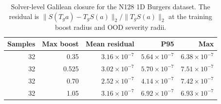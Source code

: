 \begin{table}[t]
\centering
\small
\caption{Solver-level Galilean closure for the N128 1D Burgers dataset. The residual is $\|S(T_g a)-T_gS(a)\|_2/\|T_gS(a)\|_2$ at the training boost radius and OOD severity radii.}
\label{tab:burgers-solver-closure}
\begin{tabular}{rrrrr}
\toprule
Samples & Max boost & Mean residual & P95 & Max \\
\midrule
32 & 0.35 & \(3.16\times10^{-7}\) & \(5.64\times10^{-7}\) & \(6.38\times10^{-7}\) \\
32 & 0.525 & \(3.02\times10^{-7}\) & \(5.70\times10^{-7}\) & \(7.51\times10^{-7}\) \\
32 & 0.70 & \(2.52\times10^{-7}\) & \(4.14\times10^{-7}\) & \(7.42\times10^{-7}\) \\
32 & 1.05 & \(3.16\times10^{-7}\) & \(6.92\times10^{-7}\) & \(6.93\times10^{-7}\) \\
\bottomrule
\end{tabular}
\end{table}
